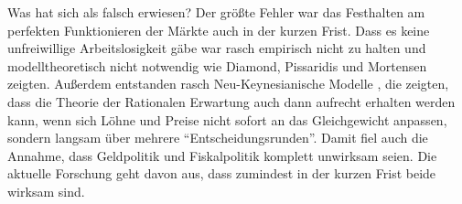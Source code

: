 Was hat sich als falsch erwiesen? Der größte Fehler war das Festhalten am perfekten Funktionieren der Märkte auch in der kurzen Frist. Dass es keine unfreiwillige Arbeitslosigkeit gäbe war rasch empirisch nicht zu halten und modelltheoretisch nicht notwendig wie Diamond, Pissaridis und Mortensen zeigten. Außerdem entstanden rasch Neu-Keynesianische Modelle , die zeigten, dass die Theorie der Rationalen Erwartung auch dann aufrecht erhalten werden kann, wenn sich Löhne und Preise nicht sofort an das Gleichgewicht anpassen, sondern langsam über mehrere "`Entscheidungsrunden"'. Damit fiel auch die Annahme, dass Geldpolitik und Fiskalpolitik komplett unwirksam seien. Die aktuelle Forschung geht davon aus, dass zumindest in der kurzen Frist beide wirksam sind.





